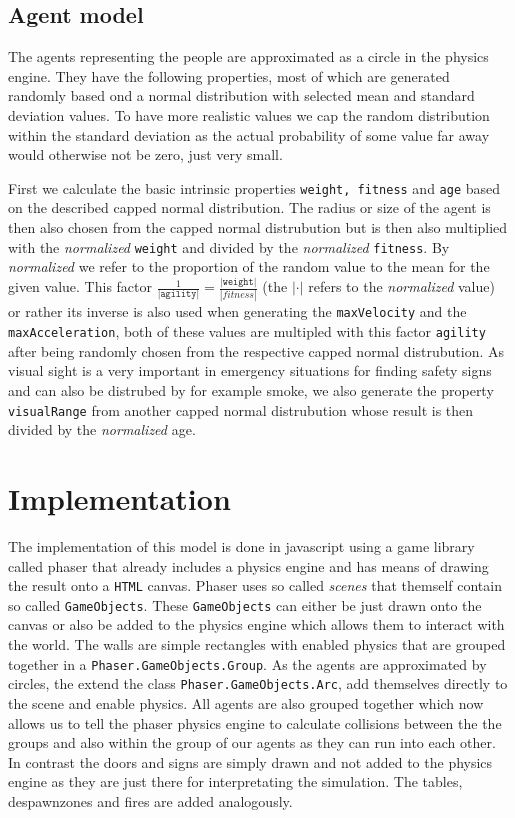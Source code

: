\documentclass[11pt]{article}
\begin{document}
\subsection{Agent model}
The agents representing the people are approximated as a circle in the physics engine. They have the following properties, most of which are generated randomly based ond a normal distribution with selected mean and standard deviation values. To have more realistic values we cap the random distribution within the standard deviation as the actual probability of some value far away would otherwise not be zero, just very small.

First we calculate the basic intrinsic properties \texttt{weight, fitness} and \texttt{age} based on the described capped normal distribution. The radius or size of the agent is then also chosen from the capped normal distrubution but is then also multiplied with the \textit{normalized} \texttt{weight} and divided by the \textit{normalized} \texttt{fitness}. By \textit{normalized} we refer to the proportion of the random value to the mean for the given value. This factor $\frac{1}{\texttt{|agility|}} = \frac{\texttt{|weight|}}{|fitness|}$ (the $|\cdot|$ refers to the \textit{normalized} value) or rather its inverse is also used when generating the \texttt{maxVelocity} and the \texttt{maxAcceleration}, both of these values are multipled with this factor \texttt{agility} after being randomly chosen from the respective capped normal distrubution. As visual sight is a very important in emergency situations for finding safety signs and can also be distrubed by for example smoke, we also generate the property \texttt{visualRange} from another capped normal distrubution whose result is then divided by the \textit{normalized} age.

\section{Implementation}

The implementation of this model is done in javascript using a game library called phaser that already includes a physics engine and has means of drawing the result onto a \texttt{HTML} canvas. Phaser uses so called \textit{scenes} that themself contain so called \texttt{GameObjects}. These \texttt{GameObjects} can either be just drawn onto the canvas or also be added to the physics engine which allows them to interact with the world. The walls are simple rectangles with enabled physics that are grouped together in a \texttt{Phaser.GameObjects.Group}. As the agents are approximated by circles, the extend the class \texttt{Phaser.GameObjects.Arc}, add themselves directly to the scene and enable physics. All agents are also grouped together which now allows us to tell the phaser physics engine to calculate collisions between the the groups and also within the group of our agents as they can run into each other. In contrast the doors and signs are simply drawn and not added to the physics engine as they are just there for interpretating the simulation. The tables, despawnzones and fires are added analogously.
\end{document}
